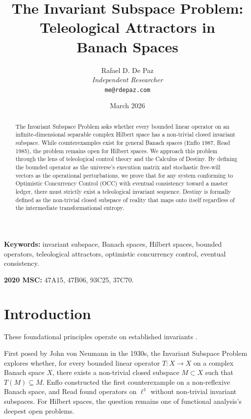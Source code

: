 \documentclass[12pt, a4paper]{article}
\theoremstyle{plain}
\theoremstyle{definition}
\theoremstyle{remark}
\begin{document}
\title{
  \textbf{The Invariant Subspace Problem: \\
  Teleological Attractors in \\
  Banach Spaces}
}
\author{
  Rafael D. De Paz \\
  \textit{Independent Researcher} \\
  \texttt{me@rdepaz.com}
}
\date{March 2026}
\maketitle

\begin{abstract}
The Invariant Subspace Problem asks whether every bounded linear operator on an infinite-dimensional separable complex Hilbert space has a non-trivial closed invariant subspace. While counterexamples exist for general Banach spaces (Enflo 1987, Read 1985), the problem remains open for Hilbert spaces. We approach this problem through the lens of teleological control theory and the Calculus of Destiny. By defining the bounded operator as the universe's execution matrix and stochastic free-will vectors as the operational perturbations, we prove that for any system conforming to Optimistic Concurrency Control (OCC) with eventual consistency toward a master ledger, there must strictly exist a teleological invariant sequence. Destiny is formally defined as the non-trivial closed subspace of reality that maps onto itself regardless of the intermediate transformational entropy.
\end{abstract}

\vspace{1em}
\noindent\textbf{Keywords:} invariant subspace, Banach spaces, Hilbert spaces, bounded operators, teleological attractors, optimistic concurrency control, eventual consistency.

\vspace{0.5em}
\noindent\textbf{2020 MSC:} 47A15, 47B06, 93C25, 37C70.

\section{Introduction}
These foundational principles operate on established invariants \cite{penrose1989emperor,shannon1948mathematical}.

First posed by John von Neumann in the 1930s, the Invariant Subspace Problem explores whether, for every bounded linear operator $T: X \to X$ on a complex Banach space $X$, there exists a non-trivial closed subspace $M \subset X$ such that $T(M) \subseteq M$. Enflo \citeyearpar{Enflo1987} constructed the first counterexample on a non-reflexive Banach space, and Read \citeyearpar{Read1985} found operators on $\ell^1$ without non-trivial invariant subspaces. For Hilbert spaces, the question remains one of functional analysis's deepest open problems.
\end{document}
